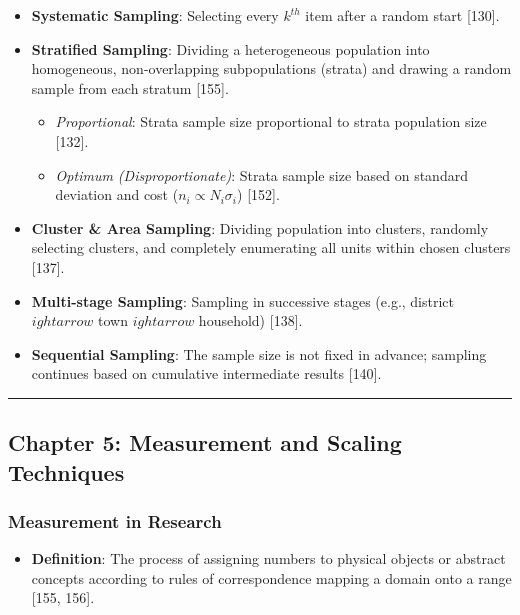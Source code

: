 \documentclass[
]{article}
\providecommand{\tightlist}{%
  \setlength{\itemsep}{0pt}\setlength{\parskip}{0pt}}
\begin{document}
\begin{itemize}
\tightlist
\item
  \textbf{Systematic Sampling}: Selecting every \(k^{th}\) item after a
  random start {[}130{]}.
\item
  \textbf{Stratified Sampling}: Dividing a heterogeneous population into
  homogeneous, non-overlapping subpopulations (strata) and drawing a
  random sample from each stratum {[}155{]}.

  \begin{itemize}
  \tightlist
  \item
    \emph{Proportional}: Strata sample size proportional to strata
    population size {[}132{]}.
  \item
    \emph{Optimum (Disproportionate)}: Strata sample size based on
    standard deviation and cost (\(n_i \propto N_i \sigma_i\))
    {[}152{]}.
  \end{itemize}
\item
  \textbf{Cluster \& Area Sampling}: Dividing population into clusters,
  randomly selecting clusters, and completely enumerating all units
  within chosen clusters {[}137{]}.
\item
  \textbf{Multi-stage Sampling}: Sampling in successive stages (e.g.,
  district \(ightarrow\) town \(ightarrow\) household) {[}138{]}.
\item
  \textbf{Sequential Sampling}: The sample size is not fixed in advance;
  sampling continues based on cumulative intermediate results {[}140{]}.
\end{itemize}

\begin{center}\rule{0.5\linewidth}{0.5pt}\end{center}

\subsection{Chapter 5: Measurement and Scaling
Techniques}\label{chapter-5-measurement-and-scaling-techniques}

\subsubsection{Measurement in Research}\label{measurement-in-research}

\begin{itemize}
\tightlist
\item
  \textbf{Definition}: The process of assigning numbers to physical
  objects or abstract concepts according to rules of correspondence
  mapping a domain onto a range {[}155, 156{]}.
\end{itemize}
\end{document}

